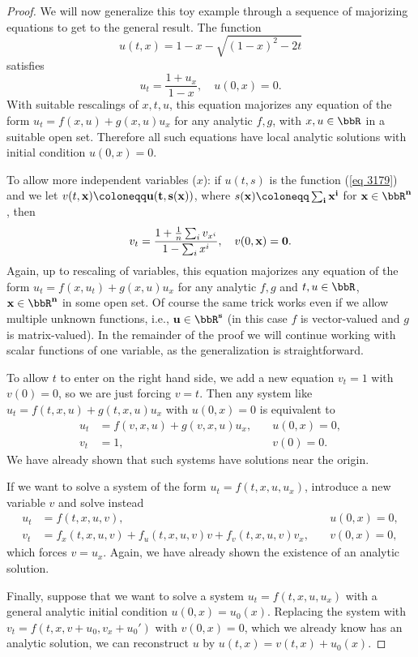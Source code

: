 \begin{proof}
    We will now generalize this toy example through a sequence of majorizing equations to get to the general result. The function 
    \[u(t,x)=1-x-\sqrt{(1-x)^2-2t}\label{eq 3179}\]
    satisfies 
    \[u_t=\frac{1+u_x}{1-x},\quad u(0,x)=0.\]
    With suitable rescalings of $x,t,u$, this equation majorizes any equation of the form $u_t=f(x,u)+g(x,u)u_x$ for any analytic $f,g$, with $x,u\in\bbR$ in a suitable open set. Therefore all such equations have local analytic solutions with initial condition $u(0,x)=0$.

    To allow more independent variables ($x$): if $u(t,s)$ is the function (\ref{eq 3179}) and we let $v(t,\bf{x})\coloneqq u(t,s(\bf{x}))$, where $s(\bf{x})\coloneqq \sum_i x^i$ for $\bf{x}\in\bbR^n$, then 
    \[v_t=\frac{1+\frac{1}{n}\sum_i v_{x^i}}{1-\sum_i x^i},\quad v(0,\bf{x})=0.\]
    Again, up to rescaling of variables, this equation majorizes any equation of the form $u_t=f(x,u_t)+g(x,u)u_x$ for any analytic $f,g$ and $t,u\in\bbR$, $\bf{x}\in\bbR^n$ in some open set. Of course the same trick works even if we allow multiple unknown functions, i.e., $\bf{u}\in\bbR^s$ (in this case $f$ is vector-valued and $g$ is matrix-valued). In the remainder of the proof we will continue working with scalar functions of one variable, as the generalization is straightforward.

    To allow $t$ to enter on the right hand side, we add a new equation $v_t=1$ with $v(0)=0$, so we are just forcing $v=t$. Then any system like $u_t=f(t,x,u)+g(t,x,u)u_x$ with $u(0,x)=0$ is equivalent to 
    \begin{align}
        u_t&=f(v,x,u)+g(v,x,u)u_x,\quad &u(0,x)=0,\\
        v_t&=1,\quad &v(0)=0.
    \end{align}
    We have already shown that such systems have solutions near the origin.

    If we want to solve a system of the form $u_t=f(t,x,u,u_x)$, introduce a new variable $v$ and solve instead 
    \begin{align}
        u_t&=f(t,x,u,v),\quad &u(0,x)=0,\\
        v_t&=f_x(t,x,u,v)+f_u(t,x,u,v)v+f_v(t,x,u,v)v_x,\quad &v(0,x)=0,
    \end{align}
    which forces $v=u_x$. Again, we have already shown the existence of an analytic solution.

    Finally, suppose that we want to solve a system $u_t=f(t,x,u,u_x)$ with a general analytic initial condition $u(0,x)=u_0(x)$. Replacing the system with $v_t=f(t,x,v+u_0,v_x+u_0')$ with $v(0,x)=0$, which we already know has an analytic solution, we can reconstruct $u$ by $u(t,x)=v(t,x)+u_0(x)$.
\end{proof}

